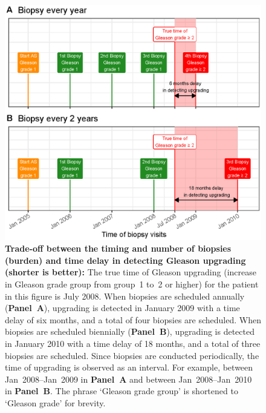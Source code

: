 \begin{figure}
\centerline{\includegraphics[width=\columnwidth]{images/delay_explanation.eps}}
\caption{\textbf{Trade-off between the timing and number of biopsies (burden) and time delay in detecting Gleason upgrading (shorter is better):} The true time of Gleason upgrading (increase in Gleason grade group from group~1 to~2 or higher) for the patient in this figure is July 2008. When biopsies are scheduled annually (\textbf{Panel~A}), upgrading is detected in January 2009 with a time delay of six months, and a total of four biopsies are scheduled. When biopsies are scheduled biennially (\textbf{Panel~B}), upgrading is detected in January 2010 with a time delay of 18 months, and a total of three biopsies are scheduled. Since biopsies are conducted periodically, the time of upgrading is observed as an interval. For example, between Jan~2008--Jan~2009 in \textbf{Panel~A} and between Jan~2008--Jan~2010 in \textbf{Panel~B}. The phrase `Gleason grade group' is shortened to `Gleason grade' for brevity.}
\label{fig:delay_explanation}
\end{figure}

